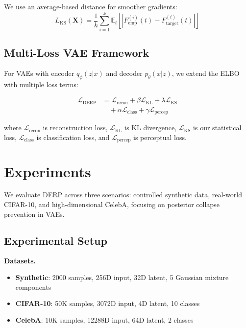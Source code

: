 \documentclass{article}
\begin{document}
We use an average-based distance for smoother gradients:
\begin{equation}
L_{\text{KS}}(\mathbf{X}) = \frac{1}{k} \sum_{i=1}^k \mathbb{E}_t[|F_{\text{emp}}^{(i)}(t) - F_{\text{target}}^{(i)}(t)|]
\end{equation}

\subsection{Multi-Loss VAE Framework}

For VAEs with encoder $q_{\phi}(z|x)$ and decoder $p_{\theta}(x|z)$, we extend the ELBO with multiple loss terms:

\begin{equation}
\begin{aligned}
\mathcal{L}_{\text{DERP}} &= \mathcal{L}_{\text{recon}} + \beta \mathcal{L}_{\text{KL}} + \lambda \mathcal{L}_{\text{KS}} \\
&\quad + \alpha \mathcal{L}_{\text{class}} + \gamma \mathcal{L}_{\text{percep}}
\end{aligned}
\end{equation}

where $\mathcal{L}_{\text{recon}}$ is reconstruction loss, $\mathcal{L}_{\text{KL}}$ is KL divergence, $\mathcal{L}_{\text{KS}}$ is our statistical loss, $\mathcal{L}_{\text{class}}$ is classification loss, and $\mathcal{L}_{\text{percep}}$ is perceptual loss.

\section{Experiments}

We evaluate DERP across three scenarios: controlled synthetic data, real-world CIFAR-10, and high-dimensional CelebA, focusing on posterior collapse prevention in VAEs.

\subsection{Experimental Setup}

\textbf{Datasets.} 
\begin{itemize}
\item \textbf{Synthetic}: 2000 samples, 256D input, 32D latent, 5 Gaussian mixture components
\item \textbf{CIFAR-10}: 50K samples, 3072D input, 4D latent, 10 classes  
\item \textbf{CelebA}: 10K samples, 12288D input, 64D latent, 2 classes
\end{itemize}
\end{document}
